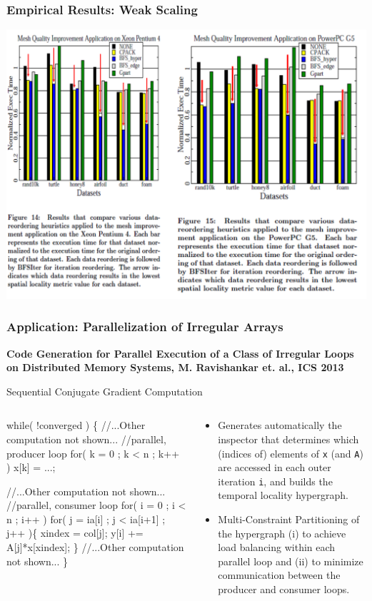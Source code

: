 \documentclass{beamer}
\newcommand{\emphh}[1]{\textcolor{CosGreen}{ #1}}
\begin{document}
\begin{frame}[fragile,t]
  \frametitle{Empirical Results: Weak Scaling}

\includegraphics[width=59ex]{Figures/DataReordRes}

\end{frame}


\begin{frame}[fragile,t]
  \frametitle{Application: Parallelization of Irregular Arrays}

\begin{scriptsize}
{\bf Code Generation for Parallel Execution of a Class
of Irregular Loops on Distributed Memory Systems, M. Ravishankar et. al., ICS 2013}
\end{scriptsize}

\begin{block}{Sequential Conjugate Gradient Computation}
\begin{columns}
\begin{colorcode}
while( !converged ) \{
    //...Other computation not shown...
    \emphh{//parallel, producer loop}
    for( k = 0 ; k < n ; k++ )  
        x[k] = ...;

    //...Other computation not shown...
    \emphh{//parallel, consumer loop}
    for( i = 0 ; i < n ; i++ ) 
        for( j = ia[i] ; j < ia[i+1] ; j++ )\{
            xindex = col[j];
            y[i] += A[j]*x[xindex];
        \}
    //...Other computation not shown...
\}
\end{colorcode}
\begin{scriptsize}
\begin{itemize}
    \item Generates automatically the inspector that determines
            which (indices of) elements of {\tt x} (and {\tt A})
            are accessed in each outer iteration {\tt i}, and builds
            the temporal locality hypergraph.
    \item Multi-Constraint Partitioning of the hypergraph
            (i) to achieve load balancing within each parallel loop and 
            (ii) to minimize communication between the producer
                    and consumer loops.
\end{itemize}
\end{scriptsize}
\end{columns}
\end{block} 

\end{frame}
\end{document}
